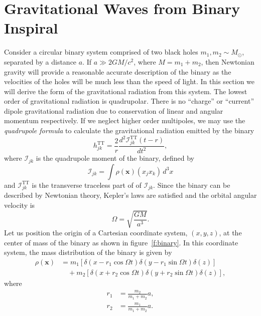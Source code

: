 \section{Gravitational Waves from Binary Inspiral}
\label{s:inspiralgw}

Consider a circular binary system comprised of two black holes $m_1, m_2 \sim
M_\odot$, separated by a distance $a$. If $a \gg 2GM/c^2$, where $M = m_1 +
m_2$, then Newtonian gravity will provide a reasonable accurate description of
the binary as the velocities of the holes will be much less than the speed of
light. In this section we will derive the form of the gravitational radiation
from this system. The lowest order of gravitational radiation is quadrupolar.
There is no ``charge'' or ``current'' dipole gravitational radiation due to
conservation of linear and angular momentum respectively. If we neglect higher
order multipoles, we may use the \emph{quadrupole formula} to calculate the
gravitational radiation emitted by the binary\cite{MTW73}
\begin{equation}
h_{jk}^\mathrm{TT} = 
\frac{2}{r} \frac{d^2 \mathcal{I}_{jk}^\mathrm{TT}(t - r)}{dt^2},
\label{eq:quadrupole}
\end{equation}
where $\mathcal{I}_{jk}$ is the quadrupole moment of the binary, defined by
\begin{equation}
\mathcal{I}_{jk} =
\int \rho(\boldsymbol{x})(x_j x_k)\,d^3 x
\label{eq:massquad}
\end{equation}
and $\mathcal{I}_{jk}^\mathrm{TT}$ is the transverse traceless part of of
$\mathcal{I}_{jk}$. Since the binary can be described by Newtonian theory,
Kepler's laws are satisfied and the orbital angular velocity is
\begin{equation}
\Omega = \sqrt{\frac{GM}{a^3}}.
\end{equation}
Let us position the origin of a Cartesian coordinate system, $(x,y,z)$, at
the center of mass of the binary as shown in figure~\ref{f:binary}. In this
coordinate system, the mass distribution of the binary is given by
\begin{equation}
\begin{split}
\rho(\boldsymbol{x}) &=
m_1\left[\delta(x - r_1 \cos\Omega t) \delta(y - r_1 \sin\Omega
t)\delta(z)\right] \\
&\quad +
m_2\left[\delta(x + r_2 \cos\Omega t) \delta(y + r_2 \sin\Omega
t)\delta(z)\right],
\label{eq:binarymassdist}
\end{split}
\end{equation}
where
\begin{align}
r_1 &= \frac{m_2}{m_1 + m_2} a, \\
r_2 &= \frac{m_1}{m_1 + m_2} a.
\end{align}
